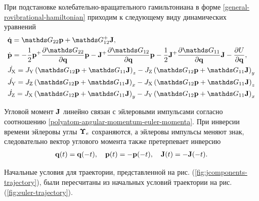 При подстановке колебательно-вращательного гамильтониана в форме \eqref{general-rovibrational-hamiltonian} приходим к следующему виду динамических уравнений
\begin{gather}
    \begin{aligned}
        &\dot{\mf{q}} = \bbG_{22} \mf{p} + \bbG_{12}^+ \mf{J}, \\
        &\dot{\mf{p}} = -\frac{1}{2} \mf{p}^+ \frac{\partial \bbG_{22}}{\partial \mf{q}} \mf{p} - \mf{J}^+ \frac{\partial \bbG_{12}}{\partial \mf{q}} \mf{p} - \frac{1}{2} \mf{J}^+ \frac{\partial \bbG_{11}}{\partial \mf{q}} \mf{J} - \frac{\partial U}{\partial \mf{q}}, \\
        &\dJx = \Jy \lb \bbG_{12} \mf{p} + \bbG_{11} \mf{J} \rb_z - \Jz \lb \bbG_{12} \mf{p} + \bbG_{11} \mf{J} \rb_y \\
        &\dJy = \Jz \lb \bbG_{12} \mf{p} + \bbG_{11} \mf{J} \rb_x - \Jx \lb \bbG_{12} \mf{p} + \bbG_{11} \mf{J} \rb_z \\
        &\dJz = \Jx \lb \bbG_{12} \mf{p} + \bbG_{11} \mf{J} \rb_y - \Jy \lb \bbG_{12} \mf{p} + \bbG_{11} \mf{J} \rb_x \\
    \end{aligned} \label{polyatom-jcomponents-system}
\end{gather}

Угловой момент $\mathbf{J}$ линейно связан с эйлеровыми импульсами согласно соотношению \eqref{polyatom-angular-momentum-euler-momenta}. При инверсии времени эйлеровы углы $\boldsymbol{\Upsilon}_e$ сохраняются, а эйлеровы импульсы меняют знак, следовательно вектор углового момента также претерпевает инверсию  
\begin{gather}
    \mathbf{q}(t) = \mathbf{q}(-t), \quad \mathbf{p}(t) = -\mathbf{p}(-t), \quad \mathbf{J}(t) = -\mathbf{J}(-t).
\end{gather}

Начальные условия для траектории, представленной на рис. (\ref{fig:jcomponents-trajectory}), были пересчитаны из начальных условий траектории на рис. (\ref{fig:euler-trajectory}). 

